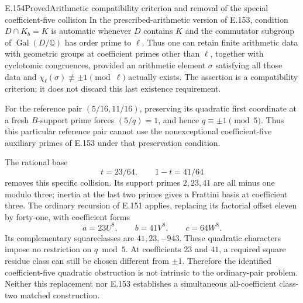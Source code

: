 \begin{result}{E.154}{Proved}{Arithmetic compatibility criterion and removal of the special coefficient-five collision}
In the prescribed-arithmetic version of E.153, condition
\(D\cap K_b=K\) is automatic whenever \(D\) contains \(K\)
and the commutator subgroup of \(\operatorname{Gal}(D/\mathbb Q)\)
has order prime to \(\ell\). Thus one can retain finite
arithmetic data with geometric groups at coefficient primes
other than \(\ell\), together with cyclotomic congruences,
provided an arithmetic element \(\sigma\) satisfying all those
data and \(\chi_\ell(\sigma)\not\equiv\pm1\pmod\ell\)
actually exists. The assertion is a compatibility criterion;
it does not discard this last existence requirement.

For the reference pair \((5/16,11/16)\), preserving its
quadratic first coordinate at a fresh \(B\)-support
prime forces \((5/q)=1\), and hence
\(q\equiv\pm1\pmod5\). Thus this particular reference pair
cannot use the nonexceptional coefficient-five auxiliary primes
of E.153 under that preservation condition.

The rational base
\[
                  t=23/64,\qquad 1-t=41/64
 \tag{E.154.1}
\]
removes this specific collision. Its support primes
\(2,23,41\) are all minus one modulo three; inertia at the
last two primes gives a Frattini basis at coefficient three.
The ordinary recursion of E.151 applies, replacing its factorial
offset eleven by forty-one, with coefficient forms
\[
                 a=23U^8,
 \qquad b=41V^8,
 \qquad c=64W^8.
 \tag{E.154.2}
\]
Its complementary squareclasses are \(41,23,-943\).
These quadratic characters impose no restriction on
\(q\bmod5\). At coefficients \(23\) and \(41\), a required
square residue class can still be chosen different from
\(\pm1\). Therefore the identified coefficient-five
quadratic obstruction is not intrinsic to the ordinary-pair
problem. Neither this replacement nor E.153 establishes a
simultaneous all-coefficient class-two matched construction.
\end{result}
